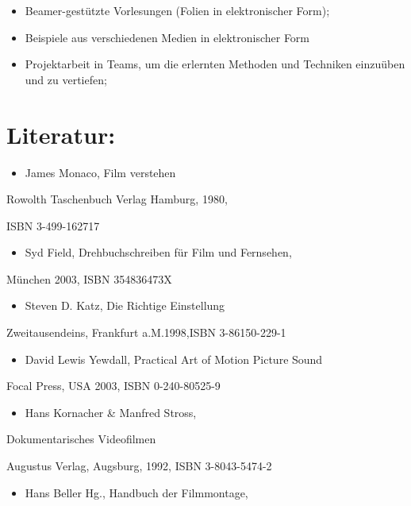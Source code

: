 \begin{itemize}
\item
  Beamer-gestützte Vorlesungen (Folien in elektronischer Form);
\item
  Beispiele aus verschiedenen Medien in elektronischer Form
\item
  Projektarbeit in Teams, um die erlernten Methoden und Techniken
  einzuüben und zu vertiefen;
\end{itemize}

\section*{Literatur:}\label{literatur-2}

\begin{itemize}
\tightlist
\item
  James Monaco, Film verstehen
\end{itemize}

Rowolth Taschenbuch Verlag Hamburg, 1980,

ISBN 3-499-162717

\begin{itemize}
\tightlist
\item
  Syd Field, Drehbuchschreiben für Film und Fernsehen,
\end{itemize}

München 2003, ISBN 354836473X

\begin{itemize}
\tightlist
\item
  Steven D. Katz, Die Richtige Einstellung
\end{itemize}

Zweitausendeins, Frankfurt a.M.1998,ISBN 3-86150-229-1

\begin{itemize}
\tightlist
\item
  David Lewis Yewdall, Practical Art of Motion Picture Sound
\end{itemize}

Focal Press, USA 2003, ISBN 0-240-80525-9

\begin{itemize}
\tightlist
\item
  Hans Kornacher \& Manfred Stross,
\end{itemize}

Dokumentarisches Videofilmen

Augustus Verlag, Augsburg, 1992, ISBN 3-8043-5474-2

\begin{itemize}
\tightlist
\item
  Hans Beller Hg., Handbuch der Filmmontage,
\end{itemize}

